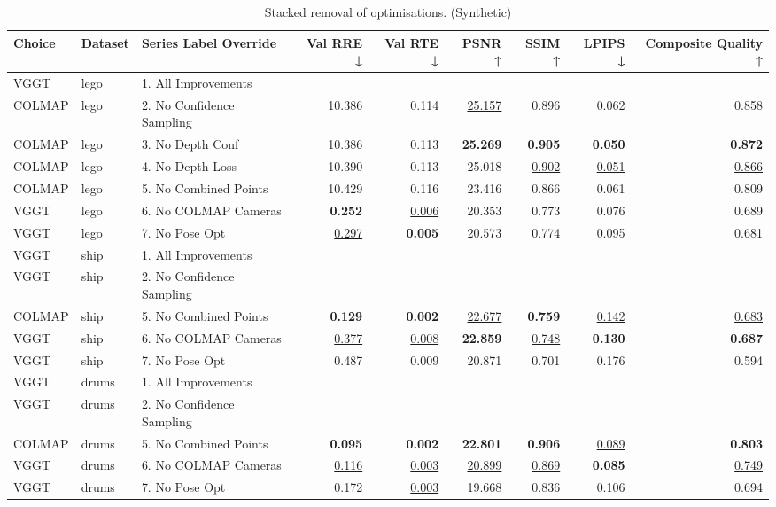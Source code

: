 \begin{table}[H]
\caption{\ifdefined\customcaption \customcaption \else Stacked removal of optimisations. (Synthetic) \fi}
\label{tab:99_all_improvements_stacked_synthetic}
\centering
\scriptsize
\begin{tabular}{lllrrrrrr}
\toprule
Choice & Dataset & Series Label Override & Val RRE ↓ & Val RTE ↓ & PSNR ↑ & SSIM ↑ & LPIPS ↓ & Composite Quality ↑ \\
\midrule
VGGT & lego & 1. All Improvements &  &  &  &  &  &  \\
COLMAP & lego & 2. No Confidence Sampling & 10.386 & 0.114 & \underline{25.157} & 0.896 & 0.062 & 0.858 \\
COLMAP & lego & 3. No Depth Conf & 10.386 & 0.113 & \textbf{25.269} & \textbf{0.905} & \textbf{0.050} & \textbf{0.872} \\
COLMAP & lego & 4. No Depth Loss & 10.390 & 0.113 & 25.018 & \underline{0.902} & \underline{0.051} & \underline{0.866} \\
COLMAP & lego & 5. No Combined Points & 10.429 & 0.116 & 23.416 & 0.866 & 0.061 & 0.809 \\
VGGT & lego & 6. No COLMAP Cameras & \textbf{0.252} & \underline{0.006} & 20.353 & 0.773 & 0.076 & 0.689 \\
VGGT & lego & 7. No Pose Opt & \underline{0.297} & \textbf{0.005} & 20.573 & 0.774 & 0.095 & 0.681 \\
\midrule
VGGT & ship & 1. All Improvements &  &  &  &  &  &  \\
VGGT & ship & 2. No Confidence Sampling &  &  &  &  &  &  \\
COLMAP & ship & 5. No Combined Points & \textbf{0.129} & \textbf{0.002} & \underline{22.677} & \textbf{0.759} & \underline{0.142} & \underline{0.683} \\
VGGT & ship & 6. No COLMAP Cameras & \underline{0.377} & \underline{0.008} & \textbf{22.859} & \underline{0.748} & \textbf{0.130} & \textbf{0.687} \\
VGGT & ship & 7. No Pose Opt & 0.487 & 0.009 & 20.871 & 0.701 & 0.176 & 0.594 \\
\midrule
VGGT & drums & 1. All Improvements &  &  &  &  &  &  \\
VGGT & drums & 2. No Confidence Sampling &  &  &  &  &  &  \\
COLMAP & drums & 5. No Combined Points & \textbf{0.095} & \textbf{0.002} & \textbf{22.801} & \textbf{0.906} & \underline{0.089} & \textbf{0.803} \\
VGGT & drums & 6. No COLMAP Cameras & \underline{0.116} & \underline{0.003} & \underline{20.899} & \underline{0.869} & \textbf{0.085} & \underline{0.749} \\
VGGT & drums & 7. No Pose Opt & 0.172 & \underline{0.003} & 19.668 & 0.836 & 0.106 & 0.694 \\
\bottomrule
\end{tabular}
\end{table}